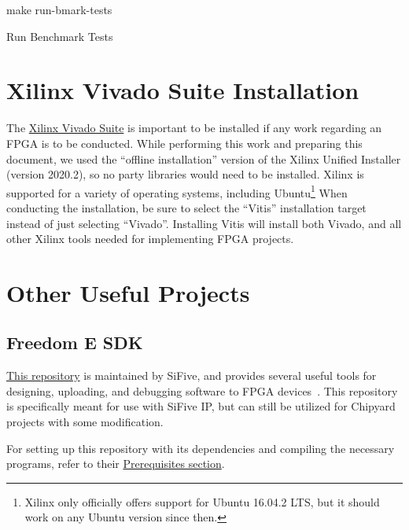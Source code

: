 \begin{listing}[h!tbp]
\begin{bashsource}
make run-bmark-tests
\end{bashsource}
\caption{Run Benchmark Tests}
\label{lst:Run_Benchmark_Tests}
\end{listing}

\section{Xilinx Vivado Suite Installation}\label{sec:Xilinx_Vivado_Suide_Install}
The \href{https://www.xilinx.com/support/download.html}{Xilinx Vivado Suite} is important to be installed if any work regarding an FPGA is to be conducted.
While performing this work and preparing this document, we used the ``offline installation'' version of the Xilinx Unified Installer (version 2020.2), so no  party libraries would need to be installed.
Xilinx is supported for a variety of operating systems, including Ubuntu\footnote{Xilinx only officially offers support for Ubuntu 16.04.2 LTS, but it should work on any Ubuntu version since then.}
When conducting the installation, be sure to select the ``Vitis'' installation target instead of just selecting ``Vivado''.
Installing Vitis will install both Vivado, and all other Xilinx tools needed for implementing FPGA projects.

\section{Other Useful Projects}\label{sec:Other_Useful_Projects}
\subsection{Freedom E SDK}\label{sec:Freedom_E_SDK}
\href{https://github.com/sifive/freedom-e-sdk}{This repository} is maintained by SiFive, and provides several useful tools for designing, uploading, and debugging software to FPGA devices~\cite{freedomESDK}.
This repository is specifically meant for use with SiFive IP, but can still be utilized for Chipyard projects with some modification.

For setting up this repository with its dependencies and compiling the necessary programs, refer to their \href{https://github.com/sifive/freedom-e-sdk#setting-up-the-sdk}{Prerequisites section}.

